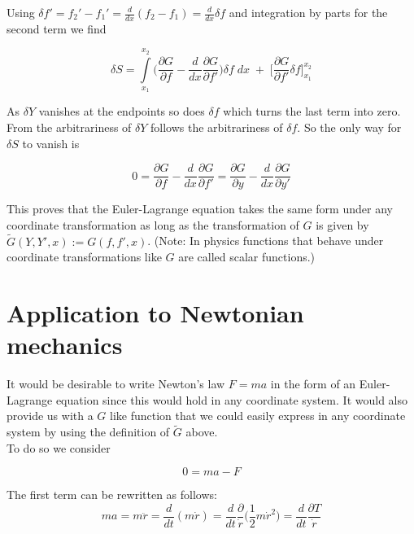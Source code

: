 \documentclass{article}
\begin{document}
Using $\delta f' = f_2' - f_1' = \frac{d}{dx}(f_2 - f_1) = \frac{d}{dx} \delta f$ and integration by parts for the second term we find


\begin{equation}
\delta S = \int\limits_{x_1}^{x_2} \bigg( \frac{\partial G}{\partial f} 
- \frac{d}{dx} \frac{\partial G}{\partial f'} \bigg) \delta f \; dx \;
+ \; \bigg[\frac{\partial G}{\partial f'} \delta f \bigg]_{x_1}^{x_2}
\end{equation}


As $\delta Y$ vanishes at the endpoints so does $\delta f$ which turns the last term into zero. From the arbitrariness of $\delta Y$ follows the arbitrariness of $\delta f$. So the only way for $\delta S$ to vanish is

\begin{equation}
0 = \frac{\partial G}{\partial f} - \frac{d}{dx} \frac{\partial G}{\partial f'} 
= \frac{\partial G}{\partial y} - \frac{d}{dx} \frac{\partial G}{\partial y'} 
\end{equation}

This proves that the Euler-Lagrange equation takes the same form under any coordinate transformation as long as the transformation of $G$ is given by $\widetilde{G}(Y,Y',x) := G(f,f',x)$. (Note: In physics functions that behave under coordinate transformations like $G$ are called scalar functions.)

\section{Application to Newtonian mechanics \cite{Guthrie}}


It would be desirable to write Newton's law $F=ma$ in the form of an Euler-Lagrange equation since this would hold in any coordinate system. It would also provide us with a $G$ like function that we could easily express in any coordinate system by using the definition of $\widetilde{G}$ above.\\

To do so we consider

\begin{equation}
0 = ma - F
\end{equation}

The first term can be rewritten as follows:
\begin{equation}
ma = m \ddot{r} = \frac{d}{dt} (m \dot{r}) 
= \frac{d}{dt} \frac{\partial}{\dot{r}} \Big(\frac{1}{2} m \dot{r}^2 \Big) 
= \frac{d}{dt} \frac{\partial T}{\dot{r}}
\end{equation}
\end{document}
